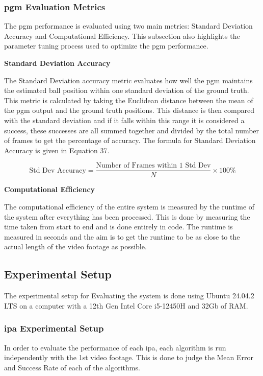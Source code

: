 \documentclass[12pt,a4paper]{article}
\begin{document}
\subsubsection{\acs{pgm} Evaluation Metrics}
The \acs{pgm} performance is evaluated using two main metrics: Standard Deviation Accuracy and Computational Efficiency. This subsection also highlights the parameter tuning process used to optimize the \acs{pgm} performance.

\textbf{Standard Deviation Accuracy}

The Standard Deviation accuracy metric evaluates how well the \acs{pgm} maintains the estimated ball position within one standard deviation of the ground truth. This metric is calculated by taking the Euclidean distance between the mean of the \acs{pgm} output and the ground truth positions. This distance is then compared with the standard deviation and if it falls within this range it is considered a success, these successes are all summed together and divided by the total number of frames to get the percentage of accuracy. The formula for Standard Deviation Accuracy is given in Equation 37.

\begin{equation}
\text{Std Dev Accuracy} = \frac{\text{Number of Frames within 1 Std Dev}}{N} \times 100\%
\end{equation}

\textbf{Computational Efficiency}

The computational efficiency of the entire system is measured by the runtime of the system after everything has been processed. This is done by measuring the time taken from start to end and is done entirely in code. The runtime is measured in seconds and the aim is to get the runtime to be as close to the actual length of the video footage as possible.

\subsection{Experimental Setup}
The experimental setup for Evaluating the system is done using Ubuntu 24.04.2 LTS on a computer with a 12th Gen Intel Core i5-12450H and 32Gb of RAM. 

\subsubsection{\acs{ipa} Experimental Setup}
In order to evaluate the performance of each \acs{ipa}, each algorithm is run independently with the 1st video footage. This is done to judge the Mean Error and Success Rate of each of the algorithms.
\end{document}
